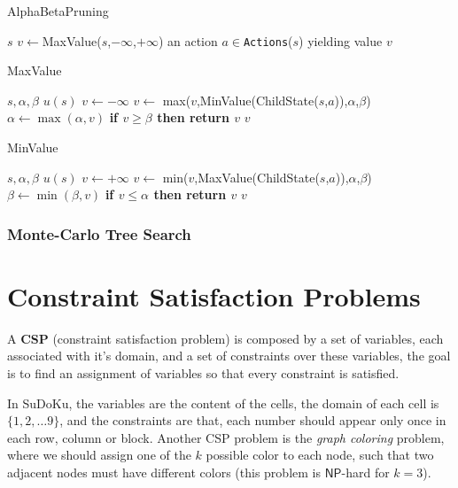 \documentclass[10pt, letterpaper]{report}
\begin{document}
 \begin{algorithm}
    \caption{AlphaBetaPruning}\label{alg:alphabetapruning}
    \begin{algorithmic}
    \Require $s$
    \State $v\leftarrow$MaxValue($s$,$-\infty$,$+\infty$)
    \State\Return an action $a\in $\texttt{Actions}($s$) yielding value $v$
    \end{algorithmic}
\end{algorithm}
 \begin{algorithm}
    \caption{MaxValue}\label{alg:ABMaxValue}
    \begin{algorithmic}
    \Require $s,\alpha,\beta$
    \State\Return $u(s)$
    \EndIf
    \State$v\leftarrow -\infty$
    \State $v\leftarrow$ max($v$,MinValue(ChildState($s$,$a$)),$\alpha$,$\beta$)
    \State$\alpha\leftarrow\max(\alpha,v)$
    \State\textbf{if $v\ge\beta$ then return $v$}
    \EndFor 
    \State\Return $v$
    \end{algorithmic}
\end{algorithm}
  \begin{algorithm}
    \caption{MinValue}\label{alg:ABMaxValue}
    \begin{algorithmic}
    \Require $s,\alpha,\beta$
    \State\Return $u(s)$
    \EndIf
    \State$v\leftarrow +\infty$
    \State $v\leftarrow$ min($v$,MaxValue(ChildState($s$,$a$)),$\alpha$,$\beta$)
    \State$\beta\leftarrow\min(\beta,v)$
    \State\textbf{if $v\le\alpha$ then return $v$}
    \EndFor 
    \State\Return $v$
    \end{algorithmic}
\end{algorithm}
\subsection{Monte-Carlo Tree Search}

\chapter{Constraint Satisfaction Problems}
\begin{definition}
    A \textbf{CSP} (constraint satisfaction problem) is composed by a set of variables, each associated with it's domain, and a set of constraints over these variables, the goal is to find an assignment of variables so that every constraint is satisfied.
\end{definition}
In SuDoKu, the variables are the content of the cells, the domain of each cell is $\{1,2,\dots 9\}$, and the constraints are that, each number should appear only once in each row, column or block. Another CSP problem is the \textit{graph coloring} problem, where we should assign one of the $k$ possible color to each node, such that two adjacent nodes must have different colors (this problem is $\mathsf{NP}$-hard for $k=3$).
\end{document}
